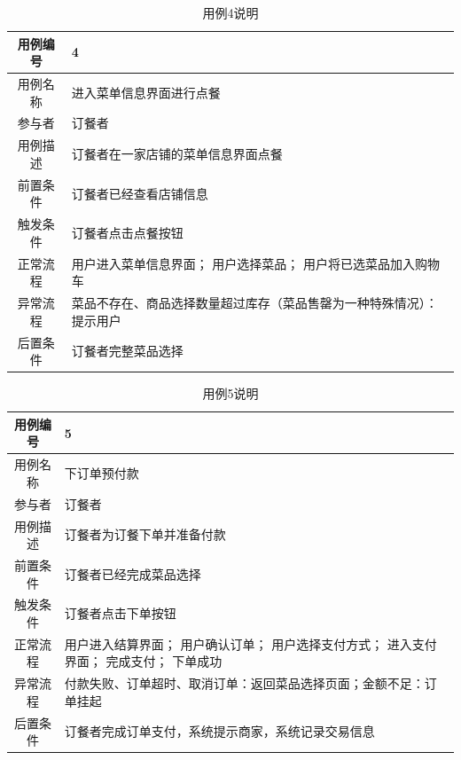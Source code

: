 \documentclass{article}
\begin{document}
    \begin{table}[H]
        \centering
        \caption{用例4说明}
        \begin{tabular}{cm{12cm}}
            \hline
            用例编号 & 4 \\
            \hline
            用例名称 & 进入菜单信息界面进行点餐 \\
            \hline
            参与者 & 订餐者 \\
            \hline
            用例描述 & 订餐者在一家店铺的菜单信息界面点餐 \\
            \hline
            前置条件 & 订餐者已经查看店铺信息 \\
            \hline
            触发条件 & 订餐者点击点餐按钮 \\
            \hline
            正常流程 & 用户进入菜单信息界面； 用户选择菜品； 用户将已选菜品加入购物车 \\
            \hline
            异常流程 & 菜品不存在、商品选择数量超过库存（菜品售罄为一种特殊情况）：提示用户 \\
            \hline
            后置条件 & 订餐者完整菜品选择 \\
            \hline
        \end{tabular}
    \end{table}
    \begin{table}[H]
        \centering
        \caption{用例5说明}
        \begin{tabular}{cm{12cm}}
            \hline
            用例编号 & 5 \\
            \hline
            用例名称 & 下订单预付款 \\
            \hline
            参与者 & 订餐者 \\
            \hline
            用例描述 & 订餐者为订餐下单并准备付款 \\
            \hline
            前置条件 & 订餐者已经完成菜品选择 \\
            \hline
            触发条件 & 订餐者点击下单按钮 \\
            \hline
            正常流程 & 用户进入结算界面； 用户确认订单； 用户选择支付方式； 进入支付界面； 完成支付； 下单成功 \\
            \hline
            异常流程 & 付款失败、订单超时、取消订单：返回菜品选择页面；金额不足：订单挂起 \\
            \hline
            后置条件 & 订餐者完成订单支付，系统提示商家，系统记录交易信息 \\
            \hline
        \end{tabular}
    \end{table}
\end{document}
